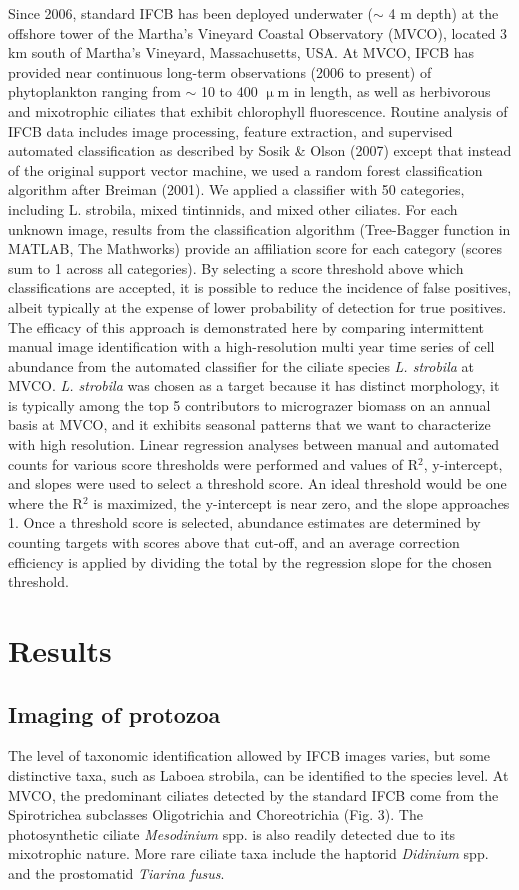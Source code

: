 Since 2006, standard IFCB has been deployed underwater ($\sim$ 4 m depth) at the offshore tower of the Martha's Vineyard Coastal Observatory (MVCO), located 3 km south of Martha's Vineyard, Massachusetts, USA. At MVCO, IFCB has provided near continuous long-term observations (2006 to present) of phytoplankton ranging from $\sim$ 10 to 400 $\upmu$m in length, as well as herbivorous and mixotrophic ciliates that exhibit chlorophyll fluorescence. Routine analysis of IFCB data includes image processing, feature extraction, and supervised automated classification as described by Sosik \& Olson (2007) except that instead of the original support vector machine, we used a random forest classification algorithm after Breiman (2001). We applied a classifier with 50 categories, including L. strobila, mixed tintinnids, and mixed other ciliates. For each unknown image, results from the classification algorithm (Tree-Bagger function in MATLAB, The Mathworks) provide an affiliation score for each category (scores sum to 1 across all categories). By selecting a score threshold above which classifications are accepted, it is possible to reduce the incidence of false positives, albeit typically at the expense of lower probability of detection for true positives. The efficacy of this approach is demonstrated here by comparing intermittent manual image identification with a high-resolution multi year time series of cell abundance from the automated classifier for the ciliate species  \textit{L. strobila} at MVCO.  \textit{L. strobila} was chosen as a target because it has distinct morphology, it is typically among the top 5 contributors to micrograzer biomass on an annual basis at MVCO, and it exhibits seasonal patterns that we want to characterize with high resolution. Linear regression analyses between manual and automated counts for various score thresholds were performed and values of R$^{2}$, y-intercept, and slopes were used to select a threshold score. An ideal threshold would be one where the R$^{2}$ is maximized, the y-intercept is near zero, and the slope approaches 1. Once a threshold score is selected, abundance estimates are determined by counting targets with scores above that cut-off, and an average correction efficiency is applied by dividing the total by the regression slope for the chosen threshold.

\section{Results}

\subsection{Imaging of protozoa}
The level of taxonomic identification allowed by IFCB images varies, but some distinctive taxa, such as Laboea strobila, can be identified to the species level. At MVCO, the predominant ciliates detected by the standard IFCB come from the Spirotrichea subclasses Oligotrichia and Choreotrichia (Fig. 3). The photosynthetic ciliate \textit{Mesodinium} spp. is also readily detected due to its mixotrophic nature. More rare ciliate taxa include the haptorid \textit{Didinium} spp. and the prostomatid \textit{Tiarina fusus}. 


